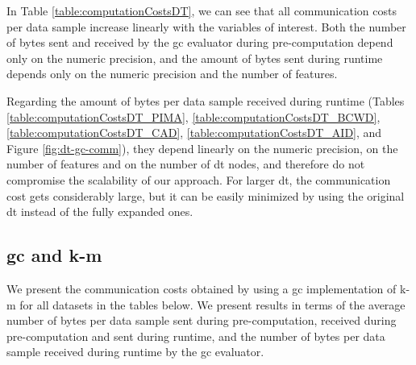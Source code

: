 In Table \ref{table:computationCostsDT}, we can see that all communication costs per data sample increase linearly with the variables of interest. Both the number of bytes sent and received by the \ac{gc} evaluator during pre-computation depend only on the numeric precision, and the amount of bytes sent during runtime depends only on the numeric precision and the number of features.

Regarding the amount of bytes per data sample received during runtime (Tables \ref{table:computationCostsDT_PIMA}, \ref{table:computationCostsDT_BCWD}, \ref{table:computationCostsDT_CAD}, \ref{table:computationCostsDT_AID}, and Figure \ref{fig:dt-gc-comm}), they depend linearly on the numeric precision, on the number of features and on the number of \ac{dt} nodes, and therefore do not compromise the scalability of our approach. For larger \ac{dt}, the communication cost gets considerably large, but it can be easily minimized by using the original \ac{dt} instead of the fully expanded ones.




\subsection{\acl{gc} and \acl{k-m}}

We present the communication costs obtained by using a \ac{gc} implementation of \ac{k-m} for all datasets in the tables below. We present results in terms of the average number of bytes per data sample sent during pre-computation, received during pre-computation and sent during runtime, and the number of bytes per data sample received during runtime by the \ac{gc} evaluator. 


